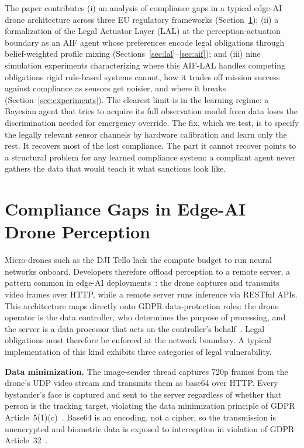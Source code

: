 \documentclass[10pt,twocolumn]{article}
\begin{document}
The paper contributes (i) an analysis of compliance gaps in a typical edge-AI drone architecture across three EU regulatory frameworks (Section~\ref{sec:gaps}); (ii) a formalization of the Legal Actuator Layer (LAL) at the perception-actuation boundary as an AIF agent whose preferences encode legal obligations through belief-weighted profile mixing (Sections~\ref{sec:lal}--\ref{sec:aif}); and (iii) nine simulation experiments characterizing where this AIF-LAL handles competing obligations rigid rule-based systems cannot, how it trades off mission success against compliance as sensors get noisier, and where it breaks (Section~\ref{sec:experiments}). The clearest limit is in the learning regime: a Bayesian agent that tries to acquire its full observation model from data loses the discrimination needed for emergency override. The fix, which we test, is to specify the legally relevant sensor channels by hardware calibration and learn only the rest. It recovers most of the lost compliance. The part it cannot recover points to a structural problem for any learned compliance system: a compliant agent never gathers the data that would teach it what sanctions look like.


\section{Compliance Gaps in Edge-AI Drone Perception}
\label{sec:gaps}

Micro-drones such as the DJI Tello lack the compute budget to run neural networks onboard. Developers therefore offload perception to a remote server, a pattern common in edge-AI deployments~\cite{zhou2019}: the drone captures and transmits video frames over HTTP, while a remote server runs inference via RESTful APIs. This architecture maps directly onto GDPR data-protection roles: the drone operator is the data controller, who determines the purpose of processing, and the server is a data processor that acts on the controller's behalf~\cite{gdpr2016}. Legal obligations must therefore be enforced at the network boundary. A typical implementation of this kind exhibits three categories of legal vulnerability.

\textbf{Data minimization.} The image-sender thread captures 720p frames from the drone's UDP video stream and transmits them as base64 over HTTP. Every bystander's face is captured and sent to the server regardless of whether that person is the tracking target, violating the data minimization principle of GDPR Article~5(1)(c)~\cite{gdpr2016}. Base64 is an encoding, not a cipher, so the transmission is unencrypted and biometric data is exposed to interception in violation of GDPR Article~32~\cite{gdpr2016}.
\end{document}
